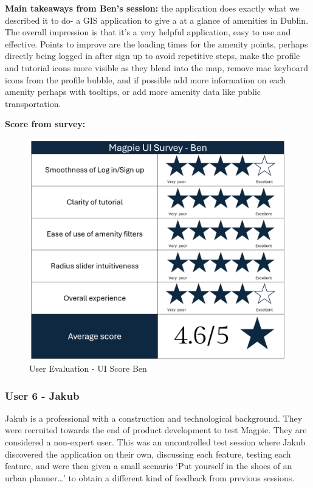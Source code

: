 \noindent\textbf{Main takeaways from Ben's session: }the application does
exactly what we described it to do- a GIS application to give a at a glance of
amenities in Dublin. The overall impression is that it's a very helpful
application, easy to use and effective. Points to improve are the loading times
for the amenity points, perhaps directly being logged in after sign up to avoid
repetitive steps, make the profile and tutorial icons more visible as they blend
into the map, remove mac keyboard icons from the profile bubble, and if possible
add more information on each amenity perhaps with tooltips, or add more amenity
data like public transportation.

\newpage{}

\textbf{Score from survey: }

\begin{figure}[h!]
    \centering
    \includegraphics[width=\textwidth]{images/survey-ben.png}
    \caption{User Evaluation - UI Score Ben}
\end{figure}

\newpage{}

\subsubsection{User 6 - Jakub}
Jakub is a professional with a construction and technological background. They
were recruited towards the end of product development to test Magpie. They are
considered a non-expert user. This was an uncontrolled test session where Jakub
discovered the application on their own, discussing each feature, testing each
feature, and were then given a small scenario `Put yourself in the shoes of an
urban planner\ldots' to obtain a different kind of feedback from previous
sessions.


